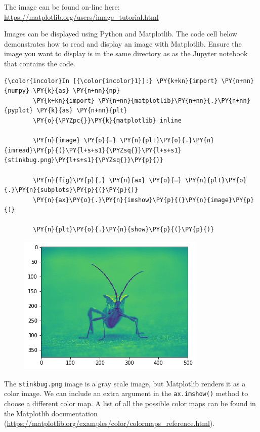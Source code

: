 \documentclass[11pt]{article}
\begin{document}
The image can be found on-line here:
\url{https://matplotlib.org/users/image_tutorial.html}

Images can be displayed using Python and Matplotlib. The code cell below
demonstrates how to read and display an image with Matplotlib. Ensure
the image you want to display is in the same directory as as the Jupyter
notebook that contains the code.

\begin{Verbatim}[commandchars=\\\{\}]
{\color{incolor}In [{\color{incolor}1}]:} \PY{k+kn}{import} \PY{n+nn}{numpy} \PY{k}{as} \PY{n+nn}{np}
        \PY{k+kn}{import} \PY{n+nn}{matplotlib}\PY{n+nn}{.}\PY{n+nn}{pyplot} \PY{k}{as} \PY{n+nn}{plt}
        \PY{o}{\PYZpc{}}\PY{k}{matplotlib} inline
        
        \PY{n}{image} \PY{o}{=} \PY{n}{plt}\PY{o}{.}\PY{n}{imread}\PY{p}{(}\PY{l+s+s1}{\PYZsq{}}\PY{l+s+s1}{stinkbug.png}\PY{l+s+s1}{\PYZsq{}}\PY{p}{)}
        
        \PY{n}{fig}\PY{p}{,} \PY{n}{ax} \PY{o}{=} \PY{n}{plt}\PY{o}{.}\PY{n}{subplots}\PY{p}{(}\PY{p}{)}
        \PY{n}{ax}\PY{o}{.}\PY{n}{imshow}\PY{p}{(}\PY{n}{image}\PY{p}{)}
        
        \PY{n}{plt}\PY{o}{.}\PY{n}{show}\PY{p}{(}\PY{p}{)}
\end{Verbatim}

\begin{figure}[!h]
\begin{center}
    \includegraphics[scale=0.5]{combined_files/combined_3_0.png}
\end{center}
\end{figure}
    
The \texttt{stinkbug.png} image is a gray scale image, but Matplotlib
renders it as a color image. We can include an extra argument in the
\texttt{ax.imshow()} method to choose a different color map. A list of
all the possible color maps can be found in the Matplotlib documentation
(\url{https://matplotlib.org/examples/color/colormaps_reference.html}).
\end{document}
